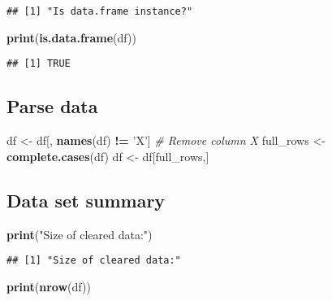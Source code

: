 \documentclass[]{article}
\newenvironment{Shaded}{\begin{snugshade}}{\end{snugshade}}
\newcommand{\CommentTok}[1]{\textcolor[rgb]{0.56,0.35,0.01}{\textit{#1}}}
\newcommand{\KeywordTok}[1]{\textcolor[rgb]{0.13,0.29,0.53}{\textbf{#1}}}
\newcommand{\NormalTok}[1]{#1}
\newcommand{\OperatorTok}[1]{\textcolor[rgb]{0.81,0.36,0.00}{\textbf{#1}}}
\newcommand{\StringTok}[1]{\textcolor[rgb]{0.31,0.60,0.02}{#1}}
\begin{document}
\begin{verbatim}
## [1] "Is data.frame instance?"
\end{verbatim}

\begin{Shaded}
\begin{Highlighting}[]
\KeywordTok{print}\NormalTok{(}\KeywordTok{is.data.frame}\NormalTok{(df))}
\end{Highlighting}
\end{Shaded}

\begin{verbatim}
## [1] TRUE
\end{verbatim}

\hypertarget{parse-data}{%
\subsection{Parse data}\label{parse-data}}

\begin{Shaded}
\begin{Highlighting}[]
\NormalTok{df <-}\StringTok{ }\NormalTok{df[, }\KeywordTok{names}\NormalTok{(df) }\OperatorTok{!=}\StringTok{ 'X'}\NormalTok{] }\CommentTok{# Remove column X}
\NormalTok{full_rows <-}\StringTok{ }\KeywordTok{complete.cases}\NormalTok{(df)}
\NormalTok{df <-}\StringTok{ }\NormalTok{df[full_rows,]}
\end{Highlighting}
\end{Shaded}

\hypertarget{data-set-summary}{%
\subsection{Data set summary}\label{data-set-summary}}

\begin{Shaded}
\begin{Highlighting}[]
\KeywordTok{print}\NormalTok{(}\StringTok{"Size of cleared data:"}\NormalTok{)}
\end{Highlighting}
\end{Shaded}

\begin{verbatim}
## [1] "Size of cleared data:"
\end{verbatim}

\begin{Shaded}
\begin{Highlighting}[]
\KeywordTok{print}\NormalTok{(}\KeywordTok{nrow}\NormalTok{(df))}
\end{Highlighting}
\end{Shaded}
\end{document}
